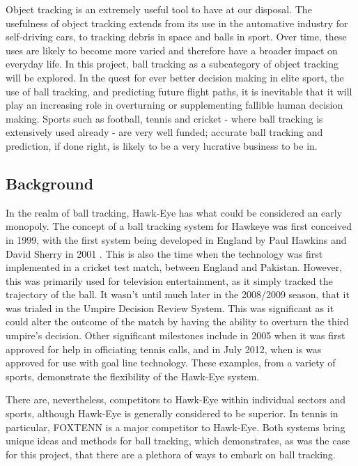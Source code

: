 \documentclass{article}
\begin{document}
Object tracking is an extremely useful tool to have at our disposal. The usefulness of object tracking extends from its use in the automative industry for self-driving cars, to tracking debris in space and balls in sport. Over time, these uses are likely to become more varied and therefore have a broader impact on everyday life. In this project, ball tracking as a subcategory of object tracking will be explored. In the quest for ever better decision making in elite sport, the use of ball tracking, and predicting future flight paths, it is inevitable that it will play an increasing role in overturning or supplementing fallible human decision making. Sports such as football, tennis and cricket - where ball tracking is extensively used already - are very well funded; accurate ball tracking and prediction, if done right, is likely to be a very lucrative business to be in.

\subsection{Background}
In the realm of ball tracking, Hawk-Eye has what could be considered an early monopoly. The concept of a ball tracking system for Hawkeye was first conceived in 1999, with the first system being developed in England by Paul Hawkins and David Sherry in 2001 \cite{1}. This is also the time when the technology was first implemented in a cricket test match, between England and Pakistan. However, this was primarily used for television entertainment, as it simply tracked the trajectory of the ball. It wasn’t until much later in the 2008/2009 season, that it was trialed in the Umpire Decision Review System. This was significant as it could alter the outcome of the match by having the ability to overturn the third umpire’s decision. Other significant milestones include in 2005 when it was first approved for help in officiating tennis calls, and in July 2012, when is was approved for use with goal line technology. These examples, from a variety of sports, demonstrate the flexibility of the Hawk-Eye system. 

There are, nevertheless, competitors to Hawk-Eye within individual sectors and sports, although Hawk-Eye is generally considered to be superior. In tennis in particular, FOXTENN is a major competitor to Hawk-Eye. Both systems bring unique ideas and methods for ball tracking, which demonstrates, as was the case for this project, that there are a plethora of ways to embark on ball tracking. 
\end{document}
